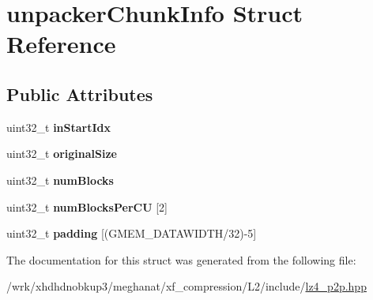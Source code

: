\hypertarget{structunpackerChunkInfo}{\section{unpacker\-Chunk\-Info Struct Reference}
\label{structunpackerChunkInfo}
}
\subsection*{Public Attributes}
\begin{DoxyCompactItemize}
\item 
\hypertarget{structunpackerChunkInfo_ae0cfab878c9220194e5bd27d8cda4066}{uint32\-\_\-t {\bfseries in\-Start\-Idx}}\label{structunpackerChunkInfo_ae0cfab878c9220194e5bd27d8cda4066}

\item 
\hypertarget{structunpackerChunkInfo_ae0c63fe150a2862355abaa9105ccfa8b}{uint32\-\_\-t {\bfseries original\-Size}}\label{structunpackerChunkInfo_ae0c63fe150a2862355abaa9105ccfa8b}

\item 
\hypertarget{structunpackerChunkInfo_aa5dd30f0efca1cd503347e400f002d75}{uint32\-\_\-t {\bfseries num\-Blocks}}\label{structunpackerChunkInfo_aa5dd30f0efca1cd503347e400f002d75}

\item 
\hypertarget{structunpackerChunkInfo_aa298c12f402078e95acef4dfac17c1e1}{uint32\-\_\-t {\bfseries num\-Blocks\-Per\-C\-U} \mbox{[}2\mbox{]}}\label{structunpackerChunkInfo_aa298c12f402078e95acef4dfac17c1e1}

\item 
\hypertarget{structunpackerChunkInfo_a27ef665c9e23274a53566dc78e489dd9}{uint32\-\_\-t {\bfseries padding} \mbox{[}(G\-M\-E\-M\-\_\-\-D\-A\-T\-A\-W\-I\-D\-T\-H/32)-\/5\mbox{]}}\label{structunpackerChunkInfo_a27ef665c9e23274a53566dc78e489dd9}

\end{DoxyCompactItemize}


The documentation for this struct was generated from the following file\-:\begin{DoxyCompactItemize}
\item 
/wrk/xhdhdnobkup3/meghanat/xf\-\_\-compression/\-L2/include/\hyperlink{lz4__p2p_8hpp}{lz4\-\_\-p2p.\-hpp}\end{DoxyCompactItemize}
